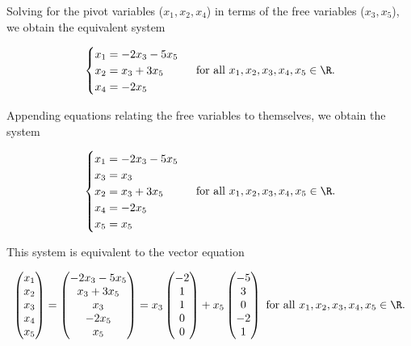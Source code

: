 \begin{example}
     Solving for the pivot variables ($x_1, x_2, x_4$) in terms of the free variables ($x_3, x_5$), we obtain the equivalent system

     \begin{align*}
         \begin{cases}
             x_1 = -2x_3 - 5x_5 \\
             x_2 = x_3 + 3x_5 \\ 
             x_4 = -2x_5
        \end{cases}
        \text{ for all $x_1, x_2, x_3, x_4, x_5 \in \R$}.
     \end{align*}

     Appending equations relating the free variables to themselves, we obtain the system
     
     \begin{align*}
         \begin{cases}
             x_1 = -2x_3 - 5x_5 \\
             x_3 = x_3 \\
             x_2 = x_3 + 3x_5 \\ 
             x_4 = -2x_5 \\
             x_5 = x_5
        \end{cases}
        \text{ for all $x_1, x_2, x_3, x_4, x_5 \in \R$}.
     \end{align*}

     This system is equivalent to the vector equation

    \begin{align*}
        \begin{pmatrix}
            x_1 \\ x_2 \\ x_3 \\ x_4 \\ x_5
        \end{pmatrix}
        =
        \begin{pmatrix}
            -2x_3 - 5x_5 \\
            x_3 + 3x_5 \\
            x_3 \\
            -2x_5 \\
            x_5
        \end{pmatrix}
        =
        x_3
        \begin{pmatrix}
            -2 \\ 1 \\ 1 \\ 0 \\ 0
        \end{pmatrix}
        + x_5
        \begin{pmatrix}
            -5 \\ 3 \\ 0 \\ -2 \\ 1
        \end{pmatrix} \text{ for all $x_1, x_2, x_3, x_4, x_5 \in \R$}.
    \end{align*}


\end{example}
